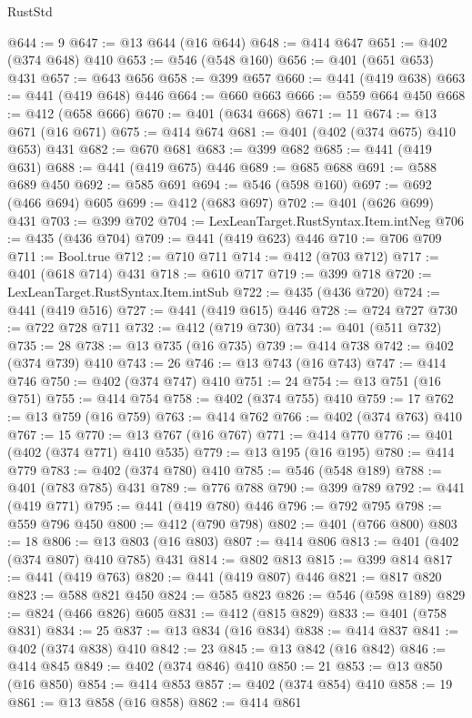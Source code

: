\begin{lexlean}{RustStd}
\begin{coremodule}
@644 := 9
@647 := @13 @644 (@16 @644)
@648 := @414 @647
@651 := @402 (@374 @648) @410
@653 := @546 (@548 @160)
@656 := @401 (@651 @653) @431
@657 := @643 @656
@658 := @399 @657
@660 := @441 (@419 @638)
@663 := @441 (@419 @648) @446
@664 := @660 @663
@666 := @559 @664 @450
@668 := @412 (@658 @666)
@670 := @401 (@634 @668)
@671 := 11
@674 := @13 @671 (@16 @671)
@675 := @414 @674
@681 := @401 (@402 (@374 @675) @410 @653) @431
@682 := @670 @681
@683 := @399 @682
@685 := @441 (@419 @631)
@688 := @441 (@419 @675) @446
@689 := @685 @688
@691 := @588 @689 @450
@692 := @585 @691
@694 := @546 (@598 @160)
@697 := @692 (@466 @694) @605
@699 := @412 (@683 @697)
@702 := @401 (@626 @699) @431
@703 := @399 @702
@704 := LexLeanTarget.RustSyntax.Item.intNeg
@706 := @435 (@436 @704)
@709 := @441 (@419 @623) @446
@710 := @706 @709
@711 := Bool.true
@712 := @710 @711
@714 := @412 (@703 @712)
@717 := @401 (@618 @714) @431
@718 := @610 @717
@719 := @399 @718
@720 := LexLeanTarget.RustSyntax.Item.intSub
@722 := @435 (@436 @720)
@724 := @441 (@419 @516)
@727 := @441 (@419 @615) @446
@728 := @724 @727
@730 := @722 @728 @711
@732 := @412 (@719 @730)
@734 := @401 (@511 @732)
@735 := 28
@738 := @13 @735 (@16 @735)
@739 := @414 @738
@742 := @402 (@374 @739) @410
@743 := 26
@746 := @13 @743 (@16 @743)
@747 := @414 @746
@750 := @402 (@374 @747) @410
@751 := 24
@754 := @13 @751 (@16 @751)
@755 := @414 @754
@758 := @402 (@374 @755) @410
@759 := 17
@762 := @13 @759 (@16 @759)
@763 := @414 @762
@766 := @402 (@374 @763) @410
@767 := 15
@770 := @13 @767 (@16 @767)
@771 := @414 @770
@776 := @401 (@402 (@374 @771) @410 @535)
@779 := @13 @195 (@16 @195)
@780 := @414 @779
@783 := @402 (@374 @780) @410
@785 := @546 (@548 @189)
@788 := @401 (@783 @785) @431
@789 := @776 @788
@790 := @399 @789
@792 := @441 (@419 @771)
@795 := @441 (@419 @780) @446
@796 := @792 @795
@798 := @559 @796 @450
@800 := @412 (@790 @798)
@802 := @401 (@766 @800)
@803 := 18
@806 := @13 @803 (@16 @803)
@807 := @414 @806
@813 := @401 (@402 (@374 @807) @410 @785) @431
@814 := @802 @813
@815 := @399 @814
@817 := @441 (@419 @763)
@820 := @441 (@419 @807) @446
@821 := @817 @820
@823 := @588 @821 @450
@824 := @585 @823
@826 := @546 (@598 @189)
@829 := @824 (@466 @826) @605
@831 := @412 (@815 @829)
@833 := @401 (@758 @831)
@834 := 25
@837 := @13 @834 (@16 @834)
@838 := @414 @837
@841 := @402 (@374 @838) @410
@842 := 23
@845 := @13 @842 (@16 @842)
@846 := @414 @845
@849 := @402 (@374 @846) @410
@850 := 21
@853 := @13 @850 (@16 @850)
@854 := @414 @853
@857 := @402 (@374 @854) @410
@858 := 19
@861 := @13 @858 (@16 @858)
@862 := @414 @861

\end{coremodule}
\end{lexlean}
